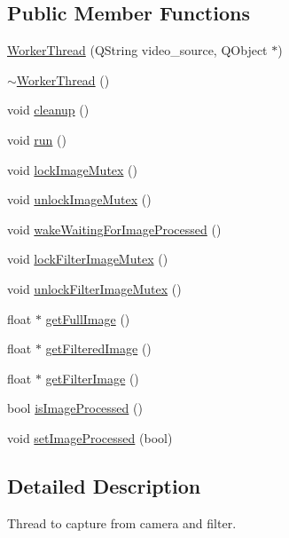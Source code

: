 \subsection*{Public Member Functions}
\begin{CompactItemize}
\item 
\hyperlink{classWorkerThread_c4ca6480ac57511724082cd4961038e4}{WorkerThread} (QString video\_\-source, QObject $\ast$)
\item 
\hyperlink{classWorkerThread_5aa554e7d73f0f185a850ca0ef145d6d}{$\sim$WorkerThread} ()
\item 
void \hyperlink{classWorkerThread_035f43bc756f6f220555fb501fad1776}{cleanup} ()
\item 
void \hyperlink{classWorkerThread_b1b55d37c2317d8799cd65ee864f7d8b}{run} ()
\item 
void \hyperlink{classWorkerThread_bed6b78d6e49140a85c80613aa58625e}{lockImageMutex} ()
\item 
void \hyperlink{classWorkerThread_46021367ce9eab463d36a150ee2a109e}{unlockImageMutex} ()
\item 
void \hyperlink{classWorkerThread_72e14fd4cfb0ff06088ed568fbbc4658}{wakeWaitingForImageProcessed} ()
\item 
void \hyperlink{classWorkerThread_9fa421c0e788a4e6e4e2bc5933aa7326}{lockFilterImageMutex} ()
\item 
void \hyperlink{classWorkerThread_dfb13dc544bc59abc5b703c27d9767ef}{unlockFilterImageMutex} ()
\item 
float $\ast$ \hyperlink{classWorkerThread_bfa352a6f31a5b62a92d5c4cebbece96}{getFullImage} ()
\item 
float $\ast$ \hyperlink{classWorkerThread_57da1f3c04f0e9972e9091783ea95d32}{getFilteredImage} ()
\item 
float $\ast$ \hyperlink{classWorkerThread_03d82e87ce2cc58dad74a00e512815fb}{getFilterImage} ()
\item 
bool \hyperlink{classWorkerThread_f33b6a6ada1af97648571411e2eb10d4}{isImageProcessed} ()
\item 
void \hyperlink{classWorkerThread_cca9ec5f0263638f8bafb5fc9cd46a07}{setImageProcessed} (bool)
\end{CompactItemize}


\subsection{Detailed Description}
Thread to capture from camera and filter. 

